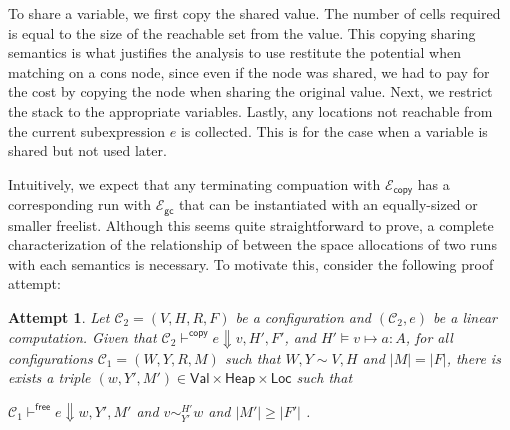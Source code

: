 \documentclass{easychair}
\newcommand{\ms}[1]{\ensuremath{\mathsf{#1}}}
\newcommand{\veq}[4]{#3 \sim^{#1}_{#2} #4}
\newcommand{\gcSem}{\ensuremath{\mathcal{E}_{\ms{gc}}}}
\newcommand{\copySem}{\ensuremath{\mathcal{E}_{\ms{copy}}}}
\newtheorem{attempt}{Attempt}
\theoremstyle{definition}
\begin{document}
To share a variable, we first copy the shared value. The number of cells required is equal to the
size of the reachable set from the value. This copying sharing semantics is what justifies the 
analysis to use restitute the potential when matching on a cons node, 
since even if the node was shared, we had to pay for the cost by copying the node when sharing the 
original value. Next, we restrict the stack to the appropriate variables. 
Lastly, any locations not reachable from the current subexpression $e$ is collected. This is 
for the case when a variable is shared but not used later.  

Intuitively, we expect that any terminating compuation
with \copySem{} has a corresponding run with \gcSem{} that can be instantiated with 
an equally-sized or smaller freelist. Although this seems quite straightforward to prove, a complete
characterization of the relationship of between the space allocations of two runs with each 
semantics is necessary. To motivate this, consider the following proof attempt: 

\begin{attempt}
	Let $\mathcal{C_2} = (V,H,R,F)$ be a configuration and $(\mathcal{C_2}, e)$ 
	be a linear computation. Given that 
	$\mathcal{C}_2 \vdash^{\mathsf{copy}} e \Downarrow v,H',F'$, and $H' \vDash v \mapsto a : A$, 
	for all configurations $\mathcal{C}_1 = (W,Y,R,M)$ such that $W,Y \sim V,H$ and $|M| = |F|$,
there is exists a triple
$(w,Y',M') \in \ms{Val} \times \ms{Heap} \times \ms{Loc}$ such that
	\begin{center}
			$\mathcal{C}_1 \vdash^{\mathsf{free}} e \Downarrow w,Y',M'$
		\hspace{3em} and \hspace{3em}	 $\veq{H'}{Y'}{v}{w}$
		\hspace{3em} and \hspace{3em}	 $|M'| \ge |F'|$ .
	\end{center}
\end{attempt}
\end{document}

